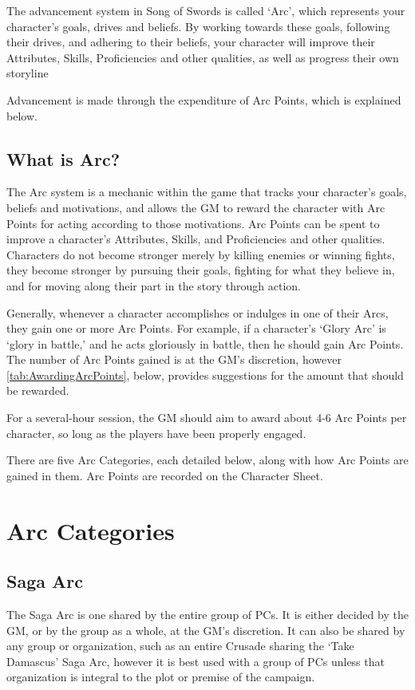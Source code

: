 \documentclass[oneside,11pt,english]{book}
\begin{document}
The advancement system in Song of Swords is called ‘Arc’, which represents your character’s goals, 
drives and beliefs. By working towards these goals, following their drives, and adhering to their beliefs, 
your character will improve their Attributes, Skills, Proficiencies and other qualities, as well as progress their own storyline 

Advancement is made through the expenditure of Arc Points, which is explained below. 


\subsection*{What is Arc?}
The Arc system is a mechanic within the game that tracks your character’s goals, beliefs and motivations, 
and allows the GM to reward the character with Arc Points for acting according to those motivations. Arc 
Points can be spent to improve a character’s Attributes, Skills, and Proficiencies and other qualities. 
Characters do not become stronger merely by killing enemies or winning fights, they become stronger by 
pursuing their goals, fighting for what they believe in, and for moving along their part in the story through 
action. 


Generally, whenever a character accomplishes or indulges in one of their Arcs,
they gain one or more Arc Points. For example, if a character’s ‘Glory Arc’ is
‘glory in battle,’ and he acts gloriously in battle, then he should gain Arc
Points. The number of Arc Points gained is at the GM’s discretion, however
\autoref{tab:AwardingArcPoints}, below, provides suggestions for the amount that
should be rewarded.

For a several-hour session, the GM should aim to award about 4-6 Arc Points per
character, so long as the players have been properly engaged.  

There are five Arc Categories, each detailed below, along with how Arc Points
are gained in them. Arc Points are recorded on the Character Sheet.  
\section{Arc Categories}

\subsection{Saga Arc}
The Saga Arc is one shared by the entire group of PCs. It is either decided by
the GM, or by the group as a whole, at the GM’s discretion. It can also be
shared by any group or organization, such as an entire Crusade sharing the ‘Take
Damascus’ Saga Arc, however it is best used with a group of PCs unless that
organization is integral to the plot or premise of the campaign.  
\end{document}
